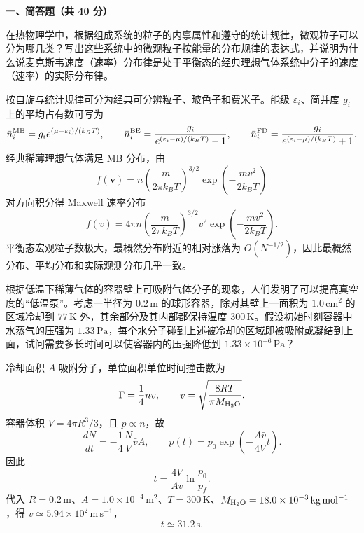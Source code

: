 ﻿

\textbf{一、简答题（共 40 分）}

\begin{question}
在热物理学中，根据组成系统的粒子的内禀属性和遵守的统计规律，微观粒子可以分为哪几类？写出这些系统中的微观粒子按能量的分布规律的表达式，并说明为什么说麦克斯韦速度（速率）分布律是处于平衡态的经典理想气体系统中分子的速度（速率）的实际分布律。
\begin{solution}
按自旋与统计规律可分为经典可分辨粒子、玻色子和费米子。能级 $\varepsilon_i$、简并度 $g_i$ 上的平均占有数可写为
\[
\bar n_i^{\rm MB}=g_i e^{(\mu-\varepsilon_i)/(k_BT)},\qquad
\bar n_i^{\rm BE}=\frac{g_i}{e^{(\varepsilon_i-\mu)/(k_BT)}-1},\qquad
\bar n_i^{\rm FD}=\frac{g_i}{e^{(\varepsilon_i-\mu)/(k_BT)}+1}.
\]
经典稀薄理想气体满足 MB 分布，由
\[
f(\mathbf v)=n\left(\frac{m}{2\pi k_BT}\right)^{3/2}
\exp\!\left(-\frac{mv^2}{2k_BT}\right)
\]
对方向积分得 Maxwell 速率分布
\[
f(v)=4\pi n\left(\frac{m}{2\pi k_BT}\right)^{3/2}v^2
\exp\!\left(-\frac{mv^2}{2k_BT}\right).
\]
平衡态宏观粒子数极大，最概然分布附近的相对涨落为 $O(N^{-1/2})$，因此最概然分布、平均分布和实际观测分布几乎一致。
\end{solution}
\end{question}

\begin{question}
根据低温下稀薄气体的容器壁上可吸附气体分子的现象，人们发明了可以提高真空度的“低温泵”。考虑一半径为 $0.2\,\mathrm m$ 的球形容器，除对其壁上一面积为 $1.0\,\mathrm{cm^2}$ 的区域冷却到 $77\,\mathrm K$ 外，其余部分及其内部都保持温度 $300\,\mathrm K$。假设初始时刻容器中水蒸气的压强为 $1.33\,\mathrm{Pa}$，每个水分子碰到上述被冷却的区域即被吸附或凝结到上面，试问需要多长时间可以使容器内的压强降低到 $1.33\times10^{-6}\,\mathrm{Pa}$？
\begin{solution}
冷却面积 $A$ 吸附分子，单位面积单位时间撞击数为
\[
\Gamma=\frac14 n\bar v,
\qquad \bar v=\sqrt{\frac{8RT}{\pi M_{\rm H_2O}}}.
\]
容器体积 $V=4\pi R^3/3$，且 $p\propto n$，故
\[
\frac{dN}{dt}=-\frac14\frac{N}{V}\bar v A,
\qquad
p(t)=p_0\exp\!\left(-\frac{A\bar v}{4V}t\right).
\]
因此
\[
t=\frac{4V}{A\bar v}\ln\frac{p_0}{p_f}.
\]
代入 $R=0.2\,\mathrm m$、$A=1.0\times10^{-4}\,\mathrm{m^2}$、$T=300\,\mathrm K$、$M_{\rm H_2O}=18.0\times10^{-3}\,\mathrm{kg\,mol^{-1}}$，得 $\bar v\simeq5.94\times10^2\,\mathrm{m\,s^{-1}}$，
\[
t\simeq 31.2\,\mathrm s.
\]
\end{solution}
\end{question}

